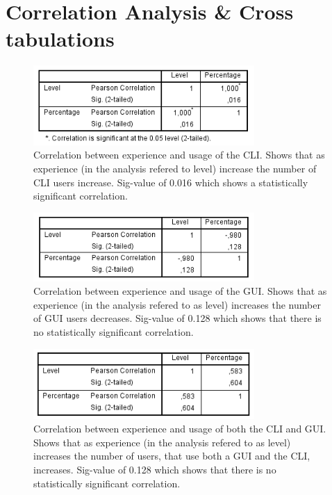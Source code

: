 \documentclass[a4paper,oneside]{bth} %
\begin{document}
		\chapter{Correlation Analysis \& Cross tabulations}
		\begin{figure}[H]
			\centering
			\includegraphics[width=0.75\textwidth]{graphs/correlation-between-knowledge-and-usage-of-cli.png}
			\caption{Correlation between experience and usage of the CLI. Shows that as experience (in the analysis refered to level) increase the number of CLI users increase. Sig-value of 0.016 which shows a statistically significant correlation.}
			\label{fig:Correlation between experience and usage of the CLI.}
		\end{figure}
		
		\begin{figure}[H]
			\centering
			\includegraphics[width=0.75\textwidth]{graphs/correlation-between-knowledge-and-usage-of-gui.png}
			\caption{Correlation between experience and usage of the GUI. Shows that as experience (in the analysis refered to as level) increases the number of GUI users decreases. Sig-value of 0.128 which shows that there is no statistically significant correlation.}
			\label{fig:Correlation between experience and usage of the GUI.}
		\end{figure}
		
		\begin{figure}[H]
			\centering
			\includegraphics[width=0.75\textwidth]{graphs/correlation-between-knowledge-and-usage-of-both.png}
			\caption{Correlation between experience and usage of both the CLI and GUI. Shows that as experience (in the analysis refered to as level) increases the number of users, that use both a GUI and the CLI, increases. Sig-value of 0.128 which shows that there is no statistically significant correlation.}
			\label{fig:Correlation between experience and usage of both the CLI and GUI.}
		\end{figure}
		
\end{document}
